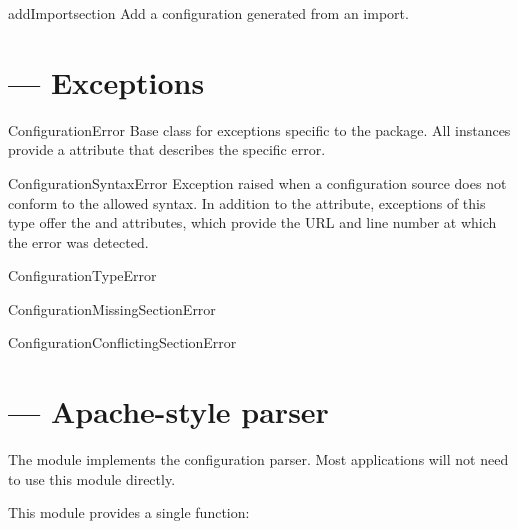 \documentclass{howto}
\begin{document}
\begin{methoddesc}[ImportingConfiguration]{addImport}{section}
  Add a configuration generated from an import.
\end{methoddesc}


\section{ --- Exceptions}


\begin{excdesc}{ConfigurationError}
  Base class for exceptions specific to the  package.
  All instances provide a  attribute that describes
  the specific error.
\end{excdesc}

\begin{excdesc}{ConfigurationSyntaxError}
  Exception raised when a configuration source does not conform to the
  allowed syntax.  In addition to the  attribute,
  exceptions of this type offer the  and 
  attributes, which provide the URL and line number at which the error
  was detected.
\end{excdesc}

\begin{excdesc}{ConfigurationTypeError}
\end{excdesc}

\begin{excdesc}{ConfigurationMissingSectionError}
\end{excdesc}

\begin{excdesc}{ConfigurationConflictingSectionError}
\end{excdesc}


\section{ --- Apache-style parser}


The  module implements the configuration
parser.  Most applications will not need to use this module directly.

This module provides a single function:
\end{document}
